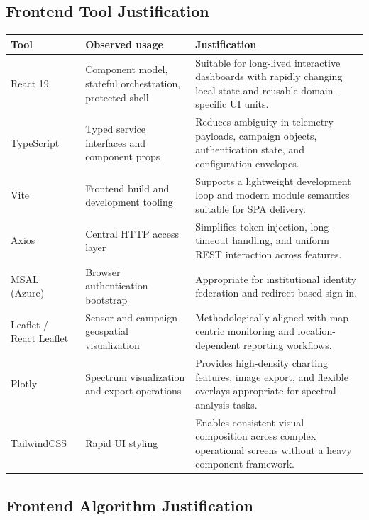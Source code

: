 \documentclass[11pt,a4paper]{article}
\begin{document}
\subsection{Frontend Tool Justification}

\begin{longtable}{@{}p{}p{}p{}@{}}
\toprule
\textbf{Tool} & \textbf{Observed usage} & \textbf{Justification} \\
\midrule
\endhead
React 19 & Component model, stateful orchestration, protected shell & Suitable for long-lived interactive dashboards with rapidly changing local state and reusable domain-specific UI units. \\
TypeScript & Typed service interfaces and component props & Reduces ambiguity in telemetry payloads, campaign objects, authentication state, and configuration envelopes. \\
Vite & Frontend build and development tooling & Supports a lightweight development loop and modern module semantics suitable for SPA delivery. \\
Axios & Central HTTP access layer & Simplifies token injection, long-timeout handling, and uniform REST interaction across features. \\
MSAL (Azure) & Browser authentication bootstrap & Appropriate for institutional identity federation and redirect-based sign-in. \\
Leaflet / React Leaflet & Sensor and campaign geospatial visualization & Methodologically aligned with map-centric monitoring and location-dependent reporting workflows. \\
Plotly & Spectrum visualization and export operations & Provides high-density charting features, image export, and flexible overlays appropriate for spectral analysis tasks. \\
TailwindCSS & Rapid UI styling & Enables consistent visual composition across complex operational screens without a heavy component framework. \\
\bottomrule
\end{longtable}

\subsection{Frontend Algorithm Justification}
\end{document}
